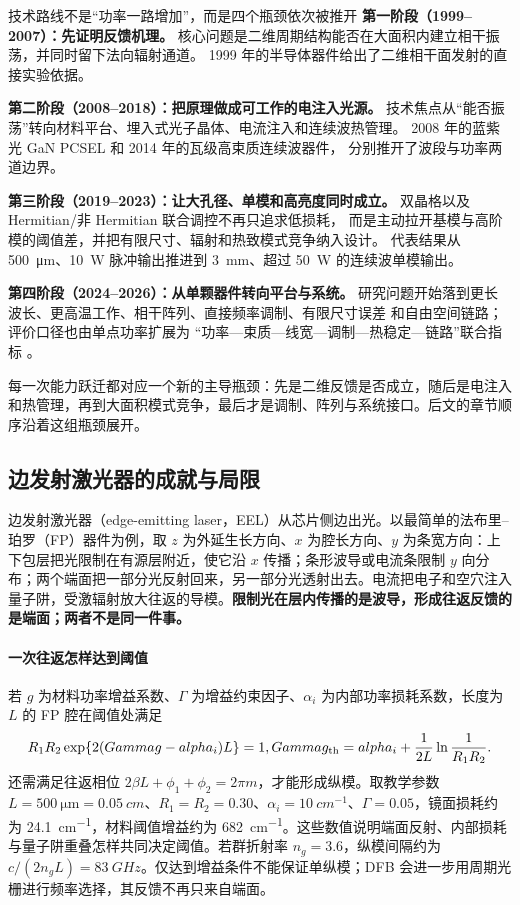 \begin{NoteBox}[breakable]{技术路线不是“功率一路增加”，而是四个瓶颈依次被推开}
\textbf{第一阶段（1999–2007）：先证明反馈机理。}
核心问题是二维周期结构能否在大面积内建立相干振荡，并同时留下法向辐射通道。
1999 年的半导体器件给出了二维相干面发射的直接实验依据\cite{imada1999}。

\textbf{第二阶段（2008–2018）：把原理做成可工作的电注入光源。}
技术焦点从“能否振荡”转向材料平台、埋入式光子晶体、电流注入和连续波热管理。
2008 年的蓝紫光 GaN PCSEL 和 2014 年的瓦级高束质连续波器件，
分别推开了波段与功率两道边界\cite{matsubara2008,hirose2014}。

\textbf{第三阶段（2019–2023）：让大孔径、单模和高亮度同时成立。}
双晶格以及 Hermitian/非 Hermitian 联合调控不再只追求低损耗，
而是主动拉开基模与高阶模的阈值差，并把有限尺寸、辐射和热致模式竞争纳入设计。
代表结果从 \SI{500}{\micro\meter}、\SI{10}{W} 脉冲输出推进到
\SI{3}{mm}、超过 \SI{50}{W} 的连续波单模输出\cite{yoshida2019,yoshida2023}。

\textbf{第四阶段（2024–2026）：从单颗器件转向平台与系统。}
研究问题开始落到更长波长、更高温工作、相干阵列、直接频率调制、有限尺寸误差
和自由空间链路；评价口径也由单点功率扩展为
“功率—束质—线宽—调制—热稳定—链路”联合指标
\cite{noda2024pcselreview,zhou2024nside1550pcsel,li2024laterallycoupledpcsel,
inoue2025fmpcsel,wang2025finitesizepcsel}。
\end{NoteBox}

每一次能力跃迁都对应一个新的主导瓶颈：先是二维反馈是否成立，随后是电注入和热管理，再到大面积模式竞争，最后才是调制、阵列与系统接口。后文的章节顺序沿着这组瓶颈展开。

\subsection{边发射激光器的成就与局限}
边发射激光器（edge-emitting laser，EEL）从芯片侧边出光。以最简单的法布里--珀罗（FP）器件为例，取 $z$ 为外延生长方向、$x$ 为腔长方向、$y$ 为条宽方向：上下包层把光限制在有源层附近，使它沿 $x$ 传播；条形波导或电流条限制 $y$ 向分布；两个端面把一部分光反射回来，另一部分光透射出去。电流把电子和空穴注入量子阱，受激辐射放大往返的导模。\textbf{限制光在层内传播的是波导，形成往返反馈的是端面；两者不是同一件事。}

\paragraph{一次往返怎样达到阈值}
若 $g$ 为材料功率增益系数、$\Gamma$ 为增益约束因子、$\alpha_i$ 为内部功率损耗系数，长度为 $L$ 的 FP 腔在阈值处满足
\[
R_1R_2\exp\{2(\Gamma g-\alpha_i)L\}=1,
\qquad
\Gamma g_{\rm th}=\alpha_i+\frac{1}{2L}\ln\frac{1}{R_1R_2}.
\]
还需满足往返相位 $2\beta L+\phi_1+\phi_2=2\pi m$，才能形成纵模。取教学参数 $L=\SI{500}{\micro\meter}=\SI{0.05}{cm}$、$R_1=R_2=0.30$、$\alpha_i=\SI{10}{cm^{-1}}$、$\Gamma=0.05$，镜面损耗约为 \SI{24.1}{cm^{-1}}，材料阈值增益约为 \SI{682}{cm^{-1}}。这些数值说明端面反射、内部损耗与量子阱重叠怎样共同决定阈值。若群折射率 $n_g=3.6$，纵模间隔约为 $c/(2n_gL)=\SI{83}{GHz}$。仅达到增益条件不能保证单纵模；DFB 会进一步用周期光栅进行频率选择，其反馈不再只来自端面。


